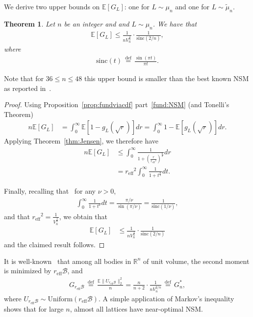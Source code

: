 \documentclass[article,doublecolumn]{IEEEtran}
\newcommand{\EE}{{\mathbb{E}}}
\newcommand{\df}{{\, \stackrel{\mathrm{def}}{=}\, }}
\newcommand{\R}{{\mathbb{R}}}
\newcommand{\BB}{{\mathcal{B}}}
\newcommand{\Unif}{\mathrm{Uniform}}
\newcommand{\sinc}{{\mathrm{sinc}}}
\newcommand{\reff}{{r_{\mathrm{eff}}}}
\newcommand{\VcdfL}{g_L}
\newtheorem{thm}{Theorem}[section]
\begin{document}
We derive two upper bounds on $\EE[G_L]$: one for $L\sim\mu_n$ and one for $L\sim\tilde{\mu}_n$.

\begin{thm}
\label{thm:excpectedN2Mbound}
 Let $n$ be an integer and and $L\sim\mu_n$. We have that
 \begin{align}
 \EE[G_L]\leq \frac{1}{n V_n^{\frac{2}{n}}}\cdot\frac{1}{\sinc(2/n)},
 \end{align}
 where
 \begin{align}
 \sinc(t)\df\frac{\sin(\pi t)}{\pi t}.
 \end{align}
\end{thm}

Note that for $36\leq n\leq 48$ this upper bound is smaller than the best known NSM as reported in~\cite[Table 1]{agrell2023best}.  

\begin{proof}
Using Proposition~\ref{prop:fundviacdf} part~\ref{fund:NSM} (and Tonelli's Theorem) 
\begin{align}
n\EE[G_L]&=\int_{0}^{\infty} \EE[1-\VcdfL(\sqrt{r})]dr=\int_{0}^{\infty} 1-\EE[\VcdfL(\sqrt{r})]dr.
\end{align}
Applying Theorem~\ref{thm:Jensen}, we therefore have
\begin{align}
 n\EE[G_L] &\leq \int_{0}^{\infty}\frac{1}{1+\left(\frac{r}{\reff^2}\right)^{\frac{n}{2}}} dr\\
&=\reff^2\int_{0}^{\infty}\frac{1}{1+t^{\frac{n}{2}}} dt. 
\end{align}

Finally, recalling that~\cite[Section 3.241]{integraltable2007} for any $\nu>0$,
\begin{align}
\int_{0}^{\infty}\frac{1}{1+t^\nu} dt=\frac{\pi/\nu}{\sin(\pi/\nu)}=\frac{1}{\sinc(1/\nu)},
\label{eq:sincintegral}
\end{align}
and that $\reff^2=\frac{1}{V_n^{\frac{2}{n}}}$, we obtain that
\begin{align}
\EE[G_L]&\leq \frac{1}{n V_n^{\frac{2}{n}}}\cdot\frac{1}{\sinc( 2/n)}
\end{align}
and the claimed result follows.
\end{proof}

It is well-known~\cite{ConwaySloane} that among all bodies in $\R^n$ of unit volume, the second moment is minimized by $\reff\BB$, and 
\begin{align}
 G_{\reff\BB}\df \frac{\EE\|U_{\reff\BB}\|_2^2}{n}=\frac{n}{n+2}\cdot \frac{1}{n V_n^{2/n}}\df G^*_{n},
\label{eq:BallNSM}
\end{align}
where $U_{\reff\BB}\sim\Unif(\reff \BB)$. A simple application of Markov's inequality shows that for large $n$, almost all lattices have near-optimal NSM.
\end{document}
